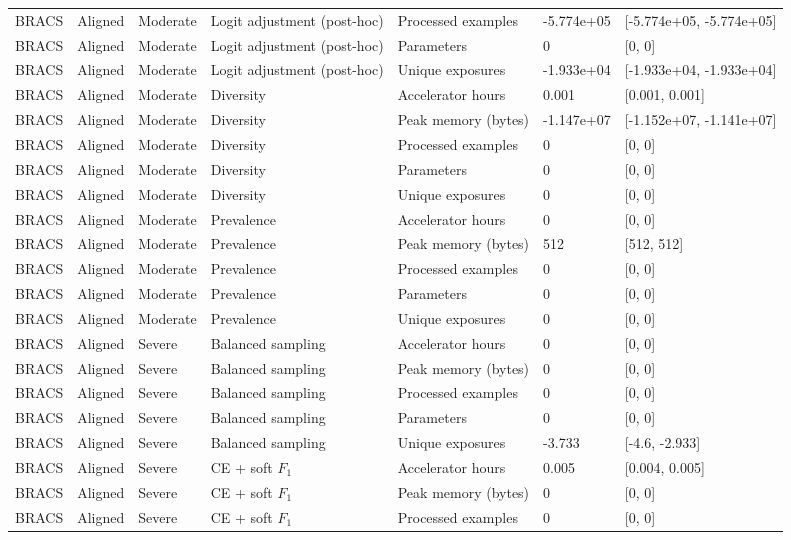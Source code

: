 \begin{longtable}{lllllll}
BRACS & Aligned & Moderate & Logit adjustment (post-hoc) & Processed examples & -5.774e+05 & [-5.774e+05, -5.774e+05] \\
BRACS & Aligned & Moderate & Logit adjustment (post-hoc) & Parameters & 0 & [0, 0] \\
BRACS & Aligned & Moderate & Logit adjustment (post-hoc) & Unique exposures & -1.933e+04 & [-1.933e+04, -1.933e+04] \\
BRACS & Aligned & Moderate & Diversity & Accelerator hours & 0.001 & [0.001, 0.001] \\
BRACS & Aligned & Moderate & Diversity & Peak memory (bytes) & -1.147e+07 & [-1.152e+07, -1.141e+07] \\
BRACS & Aligned & Moderate & Diversity & Processed examples & 0 & [0, 0] \\
BRACS & Aligned & Moderate & Diversity & Parameters & 0 & [0, 0] \\
BRACS & Aligned & Moderate & Diversity & Unique exposures & 0 & [0, 0] \\
BRACS & Aligned & Moderate & Prevalence & Accelerator hours & 0 & [0, 0] \\
BRACS & Aligned & Moderate & Prevalence & Peak memory (bytes) & 512 & [512, 512] \\
BRACS & Aligned & Moderate & Prevalence & Processed examples & 0 & [0, 0] \\
BRACS & Aligned & Moderate & Prevalence & Parameters & 0 & [0, 0] \\
BRACS & Aligned & Moderate & Prevalence & Unique exposures & 0 & [0, 0] \\
BRACS & Aligned & Severe & Balanced sampling & Accelerator hours & 0 & [0, 0] \\
BRACS & Aligned & Severe & Balanced sampling & Peak memory (bytes) & 0 & [0, 0] \\
BRACS & Aligned & Severe & Balanced sampling & Processed examples & 0 & [0, 0] \\
BRACS & Aligned & Severe & Balanced sampling & Parameters & 0 & [0, 0] \\
BRACS & Aligned & Severe & Balanced sampling & Unique exposures & -3.733 & [-4.6, -2.933] \\
BRACS & Aligned & Severe & CE + soft $F_1$ & Accelerator hours & 0.005 & [0.004, 0.005] \\
BRACS & Aligned & Severe & CE + soft $F_1$ & Peak memory (bytes) & 0 & [0, 0] \\
BRACS & Aligned & Severe & CE + soft $F_1$ & Processed examples & 0 & [0, 0] \\

\end{longtable}
